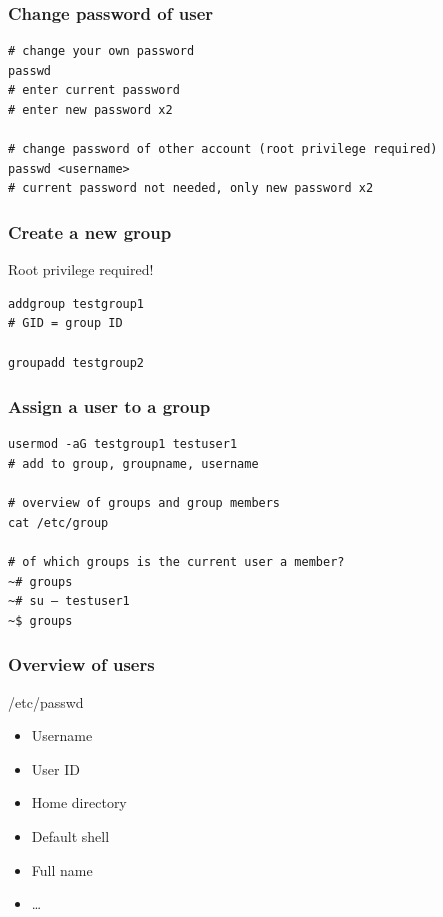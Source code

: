 \documentclass{article}
\begin{document}
\subsubsection{Change password of user}

\begin{verbatim}
# change your own password
passwd
# enter current password
# enter new password x2

# change password of other account (root privilege required)
passwd <username>
# current password not needed, only new password x2
\end{verbatim}

\subsubsection{Create a new group}

Root privilege required!

\begin{verbatim}
addgroup testgroup1
# GID = group ID

groupadd testgroup2
\end{verbatim}

\subsubsection{Assign a user to a group}

\begin{verbatim}
usermod -aG testgroup1 testuser1
# add to group, groupname, username

# overview of groups and group members
cat /etc/group

# of which groups is the current user a member?
~# groups
~# su – testuser1
~$ groups
\end{verbatim}

\subsubsection{Overview of users}

/etc/passwd

\begin{itemize}
    \item Username
    \item User ID
    \item Home directory
    \item Default shell
    \item Full name
    \item \dots
\end{itemize}
\end{document}
